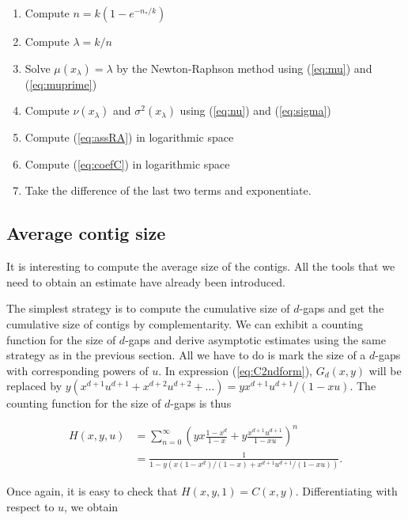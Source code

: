 \documentclass{article}
\begin{document}
\begin{enumerate}
\item Compute $n = k(1-e^{-n_*/k})$
\item Compute $\lambda = k/n$
\item Solve $\mu(x_\lambda) = \lambda$ by the Newton-Raphson method using
(\ref{eq:mu}) and (\ref{eq:muprime})
\item Compute $\nu(x_\lambda)$ and $\sigma^2(x_\lambda)$ using
(\ref{eq:nu}) and (\ref{eq:sigma})
\item Compute (\ref{eq:assRA}) in logarithmic space
\item Compute (\ref{eq:coefC}) in logarithmic space
\item Take the difference of the last two terms and exponentiate.
\end{enumerate}





\subsection{Average contig size}
\label{subsec:avctsz}

It is interesting to compute the average size of the contigs. All the
tools that we need to obtain an estimate have already been introduced.

The simplest strategy is to compute the cumulative size of $d$-gaps and
get the cumulative size of contigs by complementarity. We can exhibit a
counting function for the size of $d$-gaps and derive asymptotic estimates
using the same strategy as in the previous section. All we have to do is
mark the size of a $d$-gaps with corresponding powers of $u$. In
expression (\ref{eq:C2ndform}), $G_d(x,y)$ will be replaced by 
$y(x^{d+1}u^{d+1} + x^{d+2}u^{d+2} + \ldots ) = yx^{d+1}u^{d+1}/(1-xu)$.
The counting function for the size of $d$-gaps is thus

\begin{equation*}
\begin{split}
H(x,y,u) &= \sum_{n=0}^\infty \left(yx\frac{1-x^d}{1-x} +
y\frac{x^{d+1}u^{d+1}}{1-xu}\right)^n \\
&= \frac{1}{1-y \left(x(1-x^d)/(1-x) +
x^{d+1}u^{d+1}/(1-xu) \right)}.
\end{split}
\end{equation*}

Once again, it is easy to check that $H(x,y,1) = C(x,y)$. Differentiating
with respect to $u$, we obtain
\end{document}
